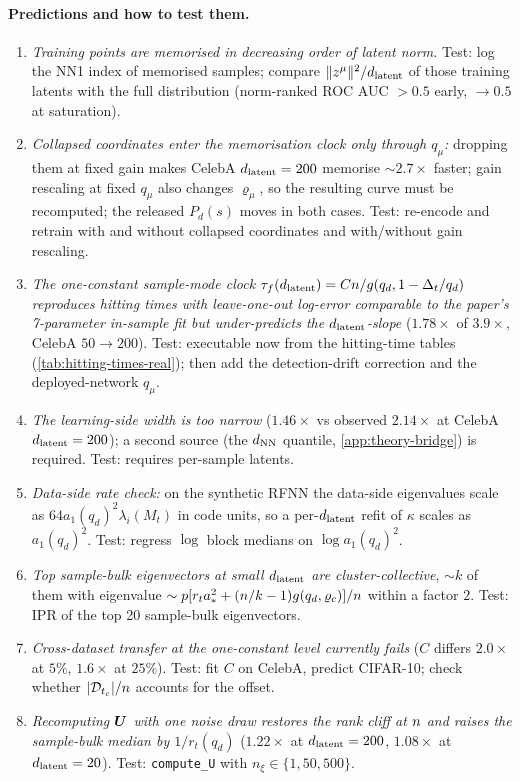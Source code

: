 \paragraph{Predictions and how to test them.}
\begin{enumerate}
\item \emph{Training points are memorised in decreasing order of latent norm.} Test: log the NN1 index of memorised samples; compare $\|z^\mu\|^2/d_{\mathrm{latent}}$ of those training latents with the full distribution (norm-ranked ROC AUC $>0.5$ early, $\to0.5$ at saturation).
\item \emph{Collapsed coordinates enter the memorisation clock only through $q_\mu$:} dropping them at fixed gain makes CelebA $d_{\mathrm{latent}}=200$ memorise $\sim2.7\times$ faster; gain rescaling at fixed $q_\mu$ also changes $\varrho_\mu$, so the resulting curve must be recomputed; the released $P_d(s)$ moves in both cases. Test: re-encode and retrain with and without collapsed coordinates and with/without gain rescaling.
\item \emph{The one-constant sample-mode clock $\tau_f(d_{\mathrm{latent}})=Cn/g(q_d,1-\Delta_t/q_d)$ reproduces hitting times with leave-one-out log-error comparable to the paper's 7-parameter in-sample fit but under-predicts the $d_{\mathrm{latent}}$-slope} ($1.78\times$ of $3.9\times$, CelebA $50\to200$). Test: executable now from the hitting-time tables (\cref{tab:hitting-times-real}); then add the detection-drift correction and the deployed-network $q_\mu$.
\item \emph{The learning-side width is too narrow} ($1.46\times$ vs observed $2.14\times$ at CelebA $d_{\mathrm{latent}}=200$); a second source (the $d_{\rm NN}$ quantile, \cref{app:theory-bridge}) is required. Test: requires per-sample latents.
\item \emph{Data-side rate check:} on the synthetic RFNN the data-side eigenvalues scale as $64a_1(q_d)^2\lambda_i(M_t)$ in code units, so a per-$d_{\mathrm{latent}}$ refit of $\kappa$ scales as $a_1(q_d)^2$. Test: regress $\log$ block medians on $\log a_1(q_d)^2$.
\item \emph{Top sample-bulk eigenvectors at small $d_{\mathrm{latent}}$ are cluster-collective}, $\sim k$ of them with eigenvalue $\sim p[r_ta_*^2+(n/k-1)g(q_d,\varrho_c)]/n$ within a factor $2$. Test: IPR of the top 20 sample-bulk eigenvectors.
\item \emph{Cross-dataset transfer at the one-constant level currently fails} ($C$ differs $2.0\times$ at $5\%$, $1.6\times$ at $25\%$). Test: fit $C$ on CelebA, predict CIFAR-10; check whether $|\mathcal D_{t_c}|/n$ accounts for the offset.
\item \emph{Recomputing $\bm{U}$ with one noise draw restores the rank cliff at $n$ and raises the sample-bulk median by $1/r_t(q_d)$} ($1.22\times$ at $d_{\mathrm{latent}}=200$, $1.08\times$ at $d_{\mathrm{latent}}=20$). Test: \texttt{compute\_U} with $n_\xi\in\{1,50,500\}$.
\end{enumerate}

